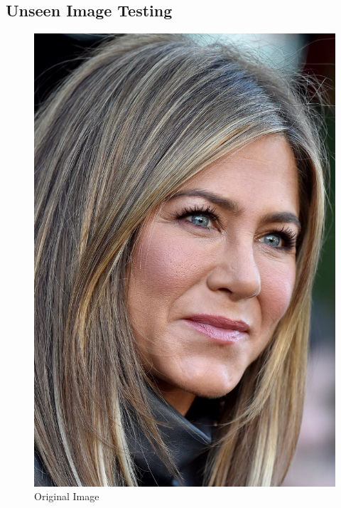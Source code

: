 \documentclass[a4paper]{article}
\begin{document}
\subsection{Unseen Image Testing}
\noindent
\begin{minipage}{0.33\textwidth}
\begin{figure}[H]
    \centering
    \includegraphics[width=\textwidth]{../code/task2/jennifer.jpg}
    \caption{Original Image}
\end{figure}
\end{minipage}
\hfill
\end{document}
